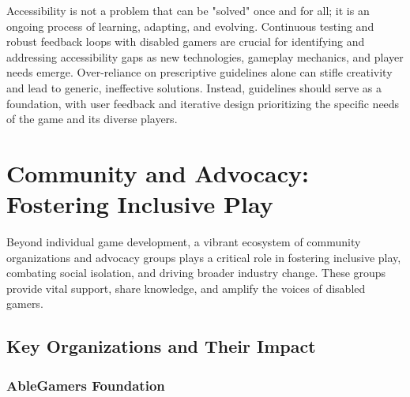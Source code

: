 Accessibility is not a problem that can be "solved" once and for all; it is an ongoing process of learning, adapting, and evolving\supercite{Wayline2025}. Continuous testing and robust feedback loops with disabled gamers are crucial for identifying and addressing accessibility gaps as new technologies, gameplay mechanics, and player needs emerge\supercite{Wayline2025}. Over-reliance on prescriptive guidelines alone can stifle creativity and lead to generic, ineffective solutions. Instead, guidelines should serve as a foundation, with user feedback and iterative design prioritizing the specific needs of the game and its diverse players\supercite{Wayline2025}.

\section{Community and Advocacy: Fostering Inclusive Play}

Beyond individual game development, a vibrant ecosystem of community organizations and advocacy groups plays a critical role in fostering inclusive play, combating social isolation, and driving broader industry change. These groups provide vital support, share knowledge, and amplify the voices of disabled gamers.

\subsection{Key Organizations and Their Impact}


\subsubsection{AbleGamers Foundation}

